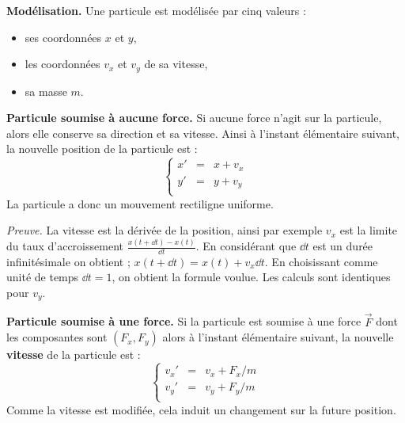 \documentclass[11pt,class=report,crop=false]{standalone}
\begin{document}





\begin{cours}

\textbf{Modélisation.}
Une particule est modélisée par cinq valeurs :
\begin{itemize}
  \item ses coordonnées $x$ et $y$,
  \item les coordonnées $v_x$ et $v_y$ de sa vitesse,
  \item sa masse $m$.
\end{itemize}


\textbf{Particule soumise à aucune force.}
Si aucune force n'agit sur la particule, alors elle conserve sa direction et sa vitesse. Ainsi à l'instant élémentaire suivant, la nouvelle position de la particule est :
$$\left\lbrace
\begin{array}{rcl}
x' &=& x + v_x \\
y' &=& y + v_y \\
\end{array}
\right.$$
La particule a donc un mouvement rectiligne uniforme.

\emph{Preuve.}
La vitesse est la dérivée de la position, ainsi par exemple
$v_x$ est la limite du taux d'accroissement $\frac{x(t+\dd t)-x(t)}{\dd t}$.
En considérant que $\dd t$ est un durée infinitésimale on obtient ;
$x(t+\dd t) = x(t) + v_x \dd t$. En choisissant comme unité de temps $\dd t=1$, on obtient la formule voulue. Les calculs sont identiques pour $v_y$.

\textbf{Particule soumise à une force.}
Si la particule est soumise à une force $\vec F$ dont les composantes sont 
$(F_x,F_y)$ alors à l'instant élémentaire suivant, la nouvelle \textbf{vitesse}
de la particule est :
$$\left\lbrace
\begin{array}{rcl}
v_x' &=& v_x + F_x/m \\
v_y' &=& v_y + F_y/m \\
\end{array}
\right.$$
Comme la vitesse est modifiée, cela induit un changement sur la future position. 


\end{cours}
\end{document}
